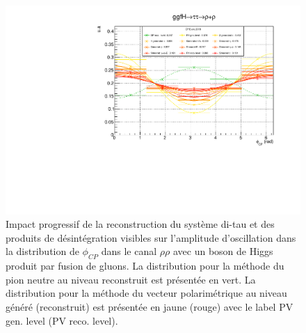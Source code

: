 \begin{figure}[!b]
    \centering
    \includegraphics[scale=0.6]{Chapitre6/Images/genprog_evenrhorho.pdf} 
  \caption{Impact progressif de la reconstruction du système di-tau et des produits de désintégration visibles sur l'amplitude d'oscillation dans la distribution de $\phi_{CP}$ dans le canal $\rho\rho$ avec un boson de Higgs produit par fusion de gluons. La distribution pour la méthode du pion neutre au niveau reconstruit est présentée en vert. La distribution pour la méthode du vecteur polarimétrique au niveau généré (reconstruit) est présentée en jaune (rouge) avec le label PV gen. level (PV reco. level).}
  \label{smearingtaus}
\end{figure}


